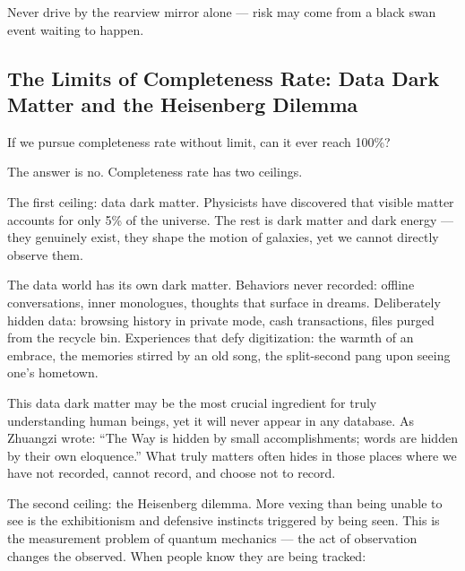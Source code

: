 
\begin{importantbox}
Never drive by the rearview mirror alone ---
risk may come from a black swan event waiting to happen.
\end{importantbox}

\newpage
\subsection{The Limits of Completeness Rate: Data Dark Matter and the Heisenberg Dilemma}

If we pursue completeness rate without limit, can it ever reach 100\%?

The answer is no. Completeness rate has two ceilings.

\vspace{1em}

The first ceiling: data dark matter.
Physicists have discovered that visible matter accounts for only 5\% of the universe. The rest is dark matter and dark energy --- they genuinely exist, they shape the motion of galaxies, yet we cannot directly observe them.

\vspace{1em}

The data world has its own dark matter.
Behaviors never recorded:
offline conversations, inner monologues, thoughts that surface in dreams.
Deliberately hidden data:
browsing history in private mode, cash transactions, files purged from the recycle bin.
Experiences that defy digitization:
the warmth of an embrace, the memories stirred by an old song, the split-second pang upon seeing one's hometown.

This data dark matter may be the most crucial ingredient for truly understanding human beings,
yet it will never appear in any database.
As Zhuangzi wrote: ``The Way is hidden by small accomplishments; words are hidden by their own eloquence.''
What truly matters often hides in those places where we have not recorded, cannot record, and choose not to record.

\vspace{1em}

The second ceiling: the Heisenberg dilemma. More vexing than being unable to see is the exhibitionism and defensive instincts triggered by being seen. This is the measurement problem of quantum mechanics --- the act of observation changes the observed.
When people know they are being tracked:

